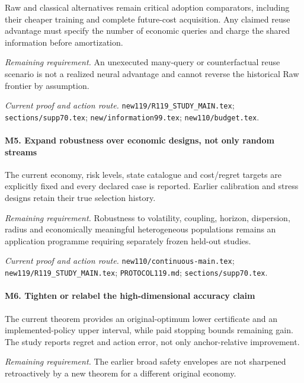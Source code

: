 Raw and classical alternatives remain critical adoption comparators, including their cheaper training and complete future-cost acquisition. Any claimed reuse advantage must specify the number of economic queries and charge the shared information before amortization.

\par\emph{Remaining requirement.} An unexecuted many-query or counterfactual reuse scenario is not a realized neural advantage and cannot reverse the historical Raw frontier by assumption.

\par\emph{Current proof and action route.} \nolinkurl{new119/R119_STUDY_MAIN.tex}; \nolinkurl{sections/supp70.tex}; \nolinkurl{new/information99.tex}; \nolinkurl{new110/budget.tex}.

\paragraph{M5. Expand robustness over economic designs, not only random streams}

The current economy, risk levels, state catalogue and cost/\allowbreak{}regret targets are explicitly fixed and every declared case is reported. Earlier calibration and stress designs retain their true selection history.

\par\emph{Remaining requirement.} Robustness to volatility, coupling, horizon, dispersion, radius and economically meaningful heterogeneous populations remains an application programme requiring separately frozen held-out studies.

\par\emph{Current proof and action route.} \nolinkurl{new110/continuous-main.tex}; \nolinkurl{new119/R119_STUDY_MAIN.tex}; \nolinkurl{PROTOCOL119.md}; \nolinkurl{sections/supp70.tex}.

\paragraph{M6. Tighten or relabel the high-dimensional accuracy claim}

The current theorem provides an original-optimum lower certificate and an implemented-policy upper interval, while paid stopping bounds remaining gain. The study reports regret and action error, not only anchor-relative improvement.

\par\emph{Remaining requirement.} The earlier broad safety envelopes are not sharpened retroactively by a new theorem for a different original economy.

